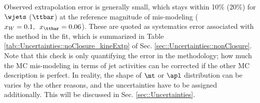 Observed extrapolation error is generally small, which stays within 10$\%$ (20$\%$) for $\wjets$ ($\ttbar$) at the reference magnitude of mis-modeling ($x_W=0.1, \,\,\, x_{\ttbar}=0.06$). These are quoted as systematics error associated with the method in the fit, which is summarized in Table \ref{tab::Uncertainties::noClosure_kineExtp} of Sec. \ref{sec::Uncertainties::nonClosure}. \\

%
% 

Note that this check is only quantifying the error in the methodology; how much the MC mis-modeling in terms of jet activities can be corrected if the other MC description is perfect.
In reality, the shape of $\mt$ or $\apl$ distribution can be varies by the other reasons, and the uncertainties have to be assigned additionally. This will be discussed in Sec. \ref{sec::Uncertainties}.

\clearpage
%


